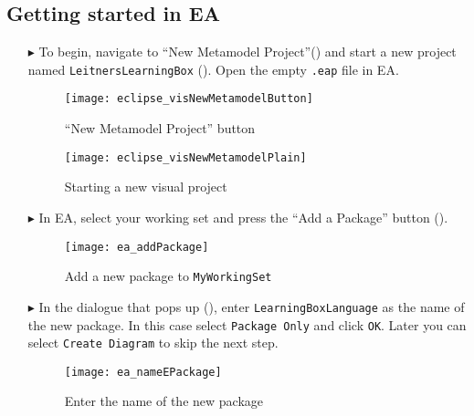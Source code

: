 \newpage
\hypertarget{static:starting vis}{}
\subsection{Getting started in EA}
\genHeader
  
\begin{itemize}

\item[$\blacktriangleright$]  To begin, navigate to ``New Metamodel Project''() and start a new project named \texttt{Leit\-ners\-Learn\-ing\-Box} (). Open the empty \texttt{.eap} file in EA.

\vspace{0.5cm}

\begin{figure}[htbp]
	\centering
  \texttt{[image: eclipse\_visNewMetamodelButton]}
	\caption{``New Metamodel Project'' button}
	\label{eclipse:newVisModelButton}
\end{figure}
\begin{figure}[htbp]
	\centering
  \texttt{[image: eclipse\_visNewMetamodelPlain]}
	\caption{Starting a new visual project}
	\label{eclipse:newVisModel}
\end{figure}

\vspace{0.5cm}

\item[$\blacktriangleright$] In EA, select your working set and press the ``Add a Package'' button (). 

\begin{figure}[htbp]
	\centering
  \texttt{[image: ea\_addPackage]}
	\caption{Add a new package to \texttt{MyWorkingSet}}
	\label{ea:newPackage}
	\vspace{0.5cm}
\end{figure}

\clearpage

\item[$\blacktriangleright$] In the dialogue that pops up (), enter \texttt{LearningBoxLanguage} as the name of the new
package. In this case select \texttt{Package Only} and click \texttt{OK}. Later you can select \texttt{Create Diagram} to skip the next step.

\vspace{0.5cm}

\begin{figure}[htbp]
	\centering
    \texttt{[image: ea\_nameEPackage]}
	\caption{Enter the name of the new package}
	\label{ea:newPackageName}
\end{figure}
\FloatBarrier


\end{itemize}
